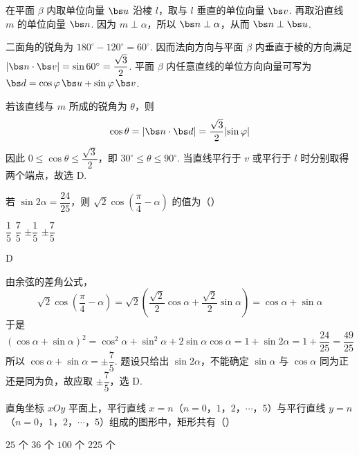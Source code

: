 \begin{solution}
在平面 \(\beta\) 内取单位向量 \(\bs u\) 沿棱 \(l\)，取与 \(l\) 垂直的单位向量 \(\bs v\). 再取沿直线 \(m\) 的单位向量 \(\bs n\). 因为 \(m\perp\alpha\)，所以 \(\bs n\perp\alpha\)，从而 \(\bs n\perp\bs u\).

二面角的锐角为 \(180^{\circ}-120^{\circ}=60^{\circ}\). 因而法向方向与平面 \(\beta\) 内垂直于棱的方向满足
\(\lvert\bs n\cdot\bs v\rvert=\sin60^{\circ}=\dfrac{\sqrt{3}}2\). 平面 \(\beta\) 内任意直线的单位方向向量可写为
\(\bs d=\cos\varphi\,\bs u+\sin\varphi\,\bs v\).

若该直线与 \(m\) 所成的锐角为 \(\theta\)，则
\[
\cos\theta=\lvert\bs n\cdot\bs d\rvert
=\frac{\sqrt{3}}2\lvert\sin\varphi\rvert
\]
因此 \(0\leqslant\cos\theta\leqslant\dfrac{\sqrt{3}}2\)，即 \(30^{\circ}\leqslant\theta\leqslant90^{\circ}\). 当直线平行于 \(v\) 或平行于 \(l\) 时分别取得两个端点，故选 D.
\end{solution}

\begin{problem}
若 \(\sin2\alpha=\dfrac{24}{25}\)，则 \(\sqrt{2}\cos\left(\dfrac{\pi}{4}-\alpha\right)\) 的值为（\quad）

\choices
    {\(\dfrac{1}{5}\)}
    {\(\dfrac{7}{5}\)}
    {\(\pm\dfrac{1}{5}\)}
    {\(\pm\dfrac{7}{5}\)}
\end{problem}

\begin{answer}
D
\end{answer}

\begin{solution}
由余弦的差角公式，
\[
\sqrt{2}\cos\left(\frac\pi4-\alpha\right)
=\sqrt{2}\left(\frac{\sqrt{2}}2\cos\alpha+\frac{\sqrt{2}}2\sin\alpha\right)
=\cos\alpha+\sin\alpha
\]
于是
\[
(\cos\alpha+\sin\alpha)^2
=\cos^2\alpha+\sin^2\alpha+2\sin\alpha\cos\alpha
=1+\sin2\alpha=1+\frac{24}{25}=\frac{49}{25}
\]
所以 \(\cos\alpha+\sin\alpha=\pm\dfrac75\). 题设只给出 \(\sin2\alpha\)，不能确定 \(\sin\alpha\) 与 \(\cos\alpha\) 同为正还是同为负，故应取 \(\pm\dfrac75\)，选 D.
\end{solution}

\begin{problem}
直角坐标 \(xOy\) 平面上，平行直线 \(x=n\)（\(n=0\)，\(1\)，\(2\)，\(\cdots\)，\(5\)）与平行直线 \(y=n\)（\(n=0\)，\(1\)，\(2\)，\(\cdots\)，\(5\)）组成的图形中，矩形共有（\quad）

\choices
    {\(25\) 个}
    {\(36\) 个}
    {\(100\) 个}
    {\(225\) 个}
\end{problem}

